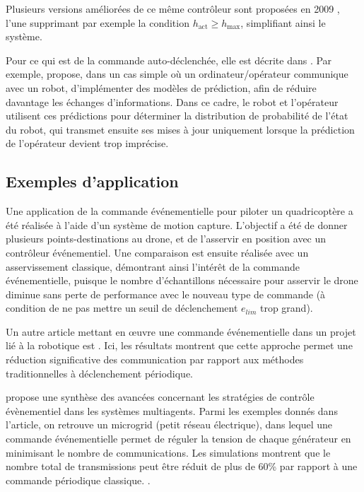 Plusieurs versions améliorées de ce même contrôleur sont proposées en 2009 \cite{durand_further_2009}, l'une supprimant par exemple la condition $h_{\text{act}} \geq h_{\text{max}}$, simplifiant ainsi le système.

Pour ce qui est de la commande auto-déclenchée, elle est décrite dans \cite{aranda-escolastico_event-based_2020}  . Par exemple, \cite{trimpe_event-based_2015} propose, dans un cas simple où un ordinateur/opérateur communique avec un robot, d'implémenter des modèles de prédiction, afin de réduire davantage les échanges d'informations. Dans ce cadre, le robot et l'opérateur utilisent ces prédictions pour déterminer la distribution de probabilité de l'état du robot, qui transmet ensuite ses mises à jour uniquement lorsque la prédiction de l'opérateur devient trop imprécise. 


\newpage

\subsection{Exemples d'application}

Une application de la commande événementielle pour piloter un quadricoptère a été réalisée \cite{durand_event-based_nodate} à l'aide d'un système de motion capture. L'objectif a été de donner plusieurs points-destinations au drone, et de l'asservir en position avec un contrôleur événementiel. Une comparaison est ensuite réalisée avec un asservissement classique, démontrant ainsi l'intérêt de la commande événementielle, puisque le nombre d'échantillons nécessaire pour asservir le drone diminue sans perte de performance avec le nouveau type de commande (à condition de ne pas mettre un seuil de déclenchement $e_{lim}$ trop grand).

Un autre article mettant en œuvre une commande événementielle dans un projet lié à la robotique est \cite{postoyan_event-triggered_2015}. Ici, les résultats montrent que cette approche permet une réduction significative des communication par rapport aux méthodes traditionnelles à déclenchement périodique. 

\cite{ding_overview_2018} propose une synthèse des avancées concernant les stratégies de contrôle évènementiel dans les systèmes multiagents. Parmi les exemples donnés dans l'article, on retrouve un microgrid (petit réseau électrique), dans lequel une commande événementielle permet de réguler la tension de chaque générateur en minimisant le nombre de communications. Les simulations montrent que le nombre total de transmissions peut être réduit de plus de 60\% par rapport à une commande périodique classique. .

